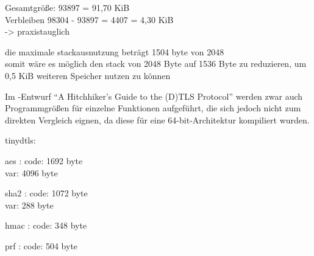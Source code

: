 Gesamtgröße: 93897 = 91,70 KiB\\
Verbleiben   98304 - 93897 = 4407 = 4,30 KiB\\
-> praxistauglich

die maximale stackausnutzung beträgt 1504 byte von 2048\\
somit wäre es möglich den stack von 2048 Byte auf 1536 Byte zu reduzieren, um 0,5 KiB weiteren Speicher nutzen zu können

Im -Entwurf "`A Hitchhiker's Guide to the (D)TLS Protocol"' \cite{draftmintls} werden zwar auch Programmgrößen für einzelne
Funktionen aufgeführt, die sich jedoch nicht zum direkten Vergleich eignen, da diese für eine 64-bit-Architektur kompiliert wurden.

tinydtls:

aes :   code: 1692 byte\\
         var: 4096 byte

sha2 :  code: 1072 byte\\
         var: 288 byte

hmac :  code: 348 byte

prf :   code: 504 byte